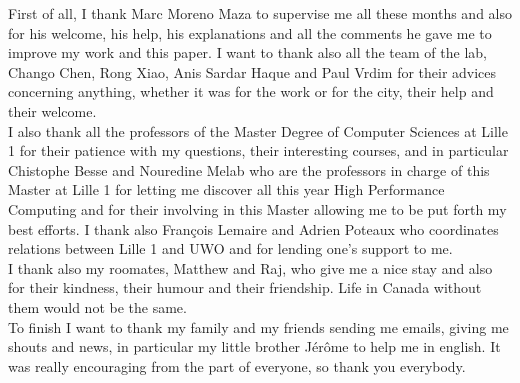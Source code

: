 First of all, I thank Marc Moreno Maza to supervise me all these months and also for his welcome, his help, his explanations and all the comments he gave me to improve my work and this paper. I want to thank also all the team of the lab, Chango Chen, Rong Xiao, Anis Sardar Haque and Paul Vrdim for their advices concerning anything, whether it was for the work or for the city, their help and their welcome.\\


I also thank all the professors of the Master Degree of Computer Sciences at Lille 1 for their patience with my questions, their interesting courses, and in particular Chistophe Besse and Nouredine Melab who are the professors in charge of this Master at Lille 1 for letting me discover all this year High Performance Computing and for their involving in this Master allowing me to be put forth my best efforts. I thank also François Lemaire and Adrien Poteaux who coordinates relations between Lille 1 and UWO and for lending one's support to me.\\

I thank also my roomates, Matthew and Raj, who give me a nice stay and also for their kindness, their humour and their friendship. Life in Canada without them would not be the same.\\

To finish I want to thank my family and my friends sending me emails, giving me shouts and news, in particular my little brother Jérôme to help me in english. It was really encouraging from the part of everyone, so thank you everybody.
